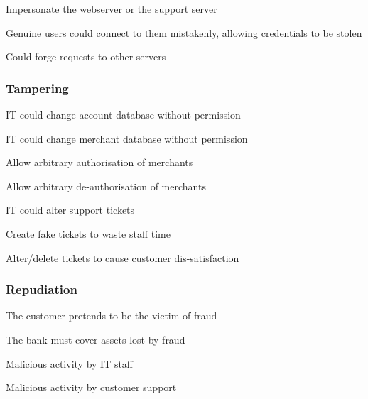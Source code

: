 \begin{numbered}
    \item \label{impersonateWebserver} Impersonate the webserver or the support server
    \begin{numbered}
        \item Genuine users could connect to them mistakenly, allowing credentials to be stolen
        \item Could forge requests to other servers
    \end{numbered}
\end{numbered}

\subsubsection{Tampering}

\begin{numbered}[resume]

    \item \label{tamperAccountDatabase} IT could change account database without permission

    \item \label{tamperMerchantDatabase} IT could change merchant database without permission
    \begin{numbered}
        \item Allow arbitrary authorisation of merchants
        \item Allow arbitrary de-authorisation of merchants
    \end{numbered}

    \item \label{tamperSupportTickets} IT could alter support tickets
    \begin{numbered}
        \item Create fake tickets to waste staff time
        \item Alter/delete tickets to cause customer dis-satisfaction
    \end{numbered}
\end{numbered}

\subsubsection{Repudiation}

\begin{numbered}[resume]
    \item \label{repudiationFraud} The customer pretends to be the victim of fraud
    \begin{numbered}
        \item The bank must cover assets lost by fraud
    \end{numbered}

    \item \label{repudiationIt} Malicious activity by IT staff
    \item \label{repudiationCustomerSupport} Malicious activity by customer support
\end{numbered}

